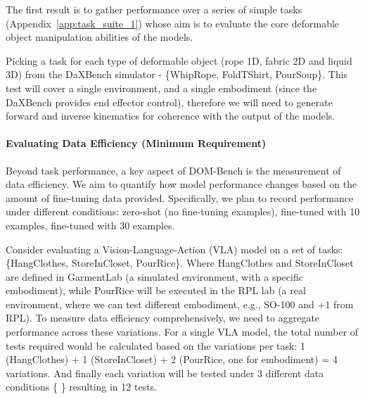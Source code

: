 The first result is to gather performance over a series of simple tasks (Appendix~\ref{app:task_suite_1}) whose aim is to evaluate the core deformable object manipulation abilities of the models.

\begin{domexample}
Picking a task for each type of deformable object (rope 1D, fabric 2D and liquid 3D) from the DaXBench simulator - \{WhipRope, FoldTShirt, PourSoup\}. This test will cover a single environment, and a single embodiment (since the DaXBench provides end effector control), therefore we will need to generate forward and inverse kinematics for coherence with the output of the models.
\end{domexample}

\paragraph{\textbf{Evaluating Data Efficiency} (Minimum Requirement) }

Beyond task performance, a key aspect of DOM-Bench is the measurement of data efficiency. We aim to quantify how model performance changes based on the amount of fine-tuning data provided. Specifically, we plan to record performance under different conditions: zero-shot (no fine-tuning examples), fine-tuned with 10 examples, fine-tuned with 30 examples.

\begin{domexample}
Consider evaluating a Vision-Language-Action (VLA) model on a set of tasks: \{HangClothes, StoreInCloset, PourRice\}. Where HangClothes and StoreInCloset are defined in GarmentLab (a simulated environment, with a specific embodiment), while PourRice will be executed in the RPL lab (a real environment, where we can test different embodiment, e.g., SO-100 and +1 from RPL). To measure data efficiency comprehensively, we need to aggregate performance across these variations. For a single VLA model, the total number of tests required would be calculated based on the variations per task: 1 (HangClothes) + 1 (StoreInCloset) + 2 (PourRice, one for embodiment) = 4 variations. And finally each variation will be tested under 3 different data conditions \{  \} resulting in 12 tests.
\end{domexample}


